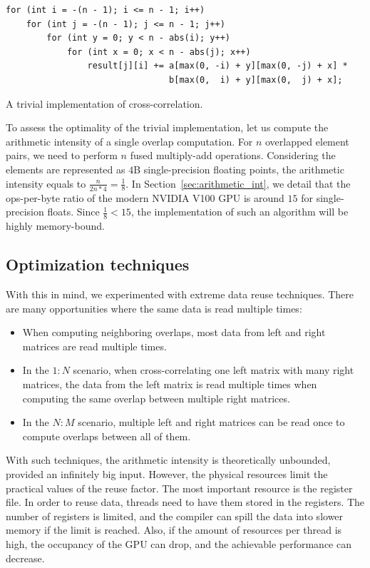\begin{listing}
\begin{verbatim}
for (int i = -(n - 1); i <= n - 1; i++)
    for (int j = -(n - 1); j <= n - 1; j++)
        for (int y = 0; y < n - abs(i); y++)
            for (int x = 0; x < n - abs(j); x++)
                result[j][i] += a[max(0, -i) + y][max(0, -j) + x] *
                                b[max(0,  i) + y][max(0,  j) + x];
\end{verbatim}
\caption{A trivial implementation of cross-correlation.}
\label{lst:cross}
\end{listing}

To assess the optimality of the trivial implementation, let us compute the arithmetic intensity of a single overlap computation. For $n$ overlapped element pairs, we need to perform $n$ fused multiply-add operations. Considering the elements are represented as $4$B single-precision floating points, the arithmetic intensity equals to $\frac{n}{2n * 4} = \frac{1}{8}$. In Section~\ref{sec:arithmetic_int}, we detail that the ops-per-byte ratio of the modern NVIDIA V100 GPU is around $15$ for single-precision floats. Since $\frac{1}{8} < 15$, the implementation of such an algorithm will be highly memory-bound.

\subsection{Optimization techniques}

With this in mind, we experimented with extreme data reuse techniques. There are many opportunities where the same data is read multiple times:
\begin{itemize}
    \item When computing neighboring overlaps, most data from left and right matrices are read multiple times.
    \item In the $1:N$ scenario, when cross-correlating one left matrix with many right matrices, the data from the left matrix is read multiple times when computing the same overlap between multiple right matrices.
    \item In the $N:M$ scenario, multiple left and right matrices can be read once to compute overlaps between all of them.
\end{itemize}

With such techniques, the arithmetic intensity is theoretically unbounded, provided an infinitely big input. However, the physical resources limit the practical values of the reuse factor. The most important resource is the register file. In order to reuse data, threads need to have them stored in the registers. The number of registers is limited, and the compiler can spill the data into slower memory if the limit is reached. Also, if the amount of resources per thread is high, the occupancy of the GPU can drop, and the achievable performance can decrease.

